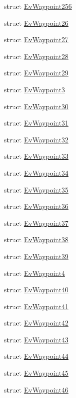 \begin{DoxyCompactItemize}
struct \hyperlink{structsmacc_1_1EvWaypoint256}{Ev\+Waypoint256}
\item 
struct \hyperlink{structsmacc_1_1EvWaypoint26}{Ev\+Waypoint26}
\item 
struct \hyperlink{structsmacc_1_1EvWaypoint27}{Ev\+Waypoint27}
\item 
struct \hyperlink{structsmacc_1_1EvWaypoint28}{Ev\+Waypoint28}
\item 
struct \hyperlink{structsmacc_1_1EvWaypoint29}{Ev\+Waypoint29}
\item 
struct \hyperlink{structsmacc_1_1EvWaypoint3}{Ev\+Waypoint3}
\item 
struct \hyperlink{structsmacc_1_1EvWaypoint30}{Ev\+Waypoint30}
\item 
struct \hyperlink{structsmacc_1_1EvWaypoint31}{Ev\+Waypoint31}
\item 
struct \hyperlink{structsmacc_1_1EvWaypoint32}{Ev\+Waypoint32}
\item 
struct \hyperlink{structsmacc_1_1EvWaypoint33}{Ev\+Waypoint33}
\item 
struct \hyperlink{structsmacc_1_1EvWaypoint34}{Ev\+Waypoint34}
\item 
struct \hyperlink{structsmacc_1_1EvWaypoint35}{Ev\+Waypoint35}
\item 
struct \hyperlink{structsmacc_1_1EvWaypoint36}{Ev\+Waypoint36}
\item 
struct \hyperlink{structsmacc_1_1EvWaypoint37}{Ev\+Waypoint37}
\item 
struct \hyperlink{structsmacc_1_1EvWaypoint38}{Ev\+Waypoint38}
\item 
struct \hyperlink{structsmacc_1_1EvWaypoint39}{Ev\+Waypoint39}
\item 
struct \hyperlink{structsmacc_1_1EvWaypoint4}{Ev\+Waypoint4}
\item 
struct \hyperlink{structsmacc_1_1EvWaypoint40}{Ev\+Waypoint40}
\item 
struct \hyperlink{structsmacc_1_1EvWaypoint41}{Ev\+Waypoint41}
\item 
struct \hyperlink{structsmacc_1_1EvWaypoint42}{Ev\+Waypoint42}
\item 
struct \hyperlink{structsmacc_1_1EvWaypoint43}{Ev\+Waypoint43}
\item 
struct \hyperlink{structsmacc_1_1EvWaypoint44}{Ev\+Waypoint44}
\item 
struct \hyperlink{structsmacc_1_1EvWaypoint45}{Ev\+Waypoint45}
\item 
struct \hyperlink{structsmacc_1_1EvWaypoint46}{Ev\+Waypoint46}
\item 

\end{DoxyCompactItemize}
